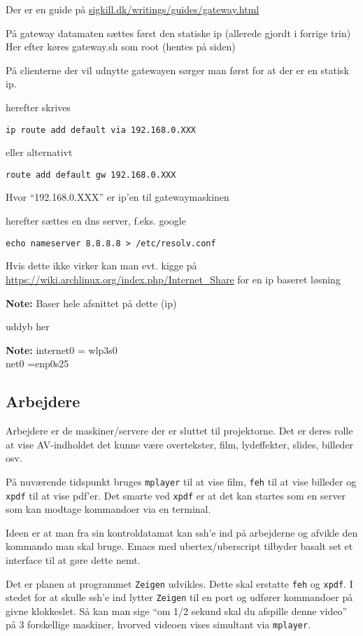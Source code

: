 \documentclass[10pt,a4paper,danish]{article}
\newcommand{\note}[1]{\begin{mdframed}[style=note]\textbf{Note:}
    #1\end{mdframed}}
\begin{document}
Der er en guide på \url{sigkill.dk/writings/guides/gateway.html}

På gateway datamaten sættes først den statiske ip (allerede gjordt i forrige
trin)
Her efter køres gateway.sh som root (hentes på siden)

På clienterne der vil udnytte gatewayen sørger man først for at der er en
statisk ip.

herefter skrives
\begin{verbatim}
ip route add default via 192.168.0.XXX
\end{verbatim}

eller alternativt
\begin{verbatim}
route add default gw 192.168.0.XXX
\end{verbatim}
Hvor ``192.168.0.XXX'' er ip'en til gatewaymaskinen

herefter sættes en dns server, f.eks. google
\begin{verbatim}
echo nameserver 8.8.8.8 > /etc/resolv.conf
\end{verbatim}

Hvis dette ikke virker kan man evt. kigge på
\url{https://wiki.archlinux.org/index.php/Internet_Share} for en ip baseret løsning
\note{Baser hele afsnittet på dette (ip)

  uddyb her}

\note{internet0 = wlp3s0\\net0 =enp0s25}
\subsection{Arbejdere}
Arbejdere er de maskiner/servere der er sluttet til projektorne. Det er deres
rolle at vise AV-indholdet det kunne være overtekster, film, lydeffekter,
slides, billeder osv.

På nuværende tidspunkt bruges \texttt{mplayer} til at vise film, \texttt{feh}
til at vise billeder og \texttt{xpdf} til at vise pdf'er.
Det smarte ved \texttt{xpdf} er at det kan startes som en server som kan modtage
kommandoer via en terminal.

Ideen er at man fra sin kontroldatamat kan ssh'e ind på arbejderne og afvikle
den kommando man skal bruge. Emacs med ubertex/uberscript tilbyder basalt set et
interface til at gøre dette nemt.

Det er planen at programmet \texttt{Zeigen} udvikles.
Dette skal erstatte \texttt{feh} og \texttt{xpdf}.
I stedet for at skulle ssh'e ind lytter \texttt{Zeigen} til en port og udfører
kommandoer på givne klokkeslet. Så kan man sige ``om 1/2 sekund skal du afspille
denne video'' på 3 forskellige maskiner, hvorved videoen vises simultant via
\texttt{mplayer}.
\end{document}
